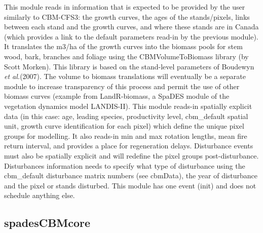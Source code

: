 \documentclass[]{article}
\begin{document}
This module reads in information that is expected to be provided by the
user similarly to CBM-CFS3: the growth curves, the ages of the
stands/pixels, links between each stand and the growth curves, and where
these stands are in Canada (which provides a link to the default
parameters read-in by the previous module). It translates the m3/ha of
the growth curves into the biomass pools for stem wood, bark, branches
and foliage using the CBMVolumeToBiomass library (by Scott Morken). This
library is based on the stand-level parameters of Boudewyn \emph{et
al.}(2007). The volume to biomass translations will eventually be a
separate module to increase transparency of this process and permit the
use of other biomass curves (example from LandR-biomass, a SpaDES module
of the vegetation dynamics model LANDIS-II). This module reads-in
spatially explicit data (in this case: age, leading species,
productivity level, cbm\_default spatial unit, growth curve
identification for each pixel) which define the unique pixel groups for
modelling. It also reads-in min and max rotation lengths, mean fire
return interval, and provides a place for regeneration delays.
Disturbance events must also be spatially explicit and will redefine the
pixel groups post-disturbance. Disturbances information needs to specify
what type of disturbance using the cbm\_default disturbance matrix
numbers (see cbmData), the year of disturbance and the pixel or stands
disturbed. This module has one event (init) and does not schedule
anything else.

\subsection{spadesCBMcore}\label{spadescbmcore}
\end{document}
